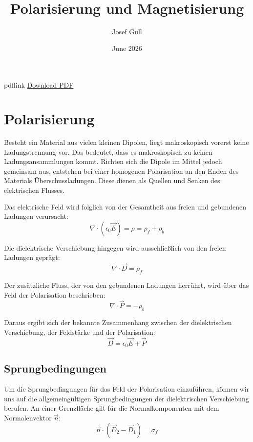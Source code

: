 \documentclass[11pt]{article}
\title{Polarisierung und Magnetisierung}
\author{Josef Gull}
\date{June 2026}
\begin{document}
\maketitle
\begin{warpHTML}
\begin{BlockClass}{pdflink}
\href{polarisierung-magnetisierung.pdf}{Download PDF}
\end{BlockClass}
\end{warpHTML}
\tableofcontents

\section{Polarisierung}
Besteht ein Material aus vielen kleinen Dipolen, liegt makroskopisch vorerst keine Ladungstrennung vor. Das bedeutet, dass es makroskopisch zu keinen Ladungsansammlungen kommt. Richten sich die Dipole im Mittel jedoch gemeinsam aus, entstehen bei einer homogenen Polarisation an den Enden des Materials Überschussladungen. Diese dienen als Quellen und Senken des elektrischen Flusses.

Das elektrische Feld wird folglich von der Gesamtheit aus freien und gebundenen Ladungen verursacht:
\begin{equation}
    \nabla \cdot (\epsilon_0 \vec{E}) = \rho = \rho_f + \rho_b
\end{equation}

Die dielektrische Verschiebung hingegen wird ausschließlich von den freien Ladungen geprägt:
\begin{equation}
    \nabla \cdot \vec{D} = \rho_f
\end{equation}

Der zusätzliche Fluss, der von den gebundenen Ladungen herrührt, wird über das Feld der Polarisation beschrieben:
\begin{equation}
    \nabla \cdot \vec{P} = -\rho_b
\end{equation}

Daraus ergibt sich der bekannte Zusammenhang zwischen der dielektrischen Verschiebung, der Feldstärke und der Polarisation:
\begin{equation}
    \vec{D} = \epsilon_0 \vec{E} + \vec{P}
\end{equation}

\subsection{Sprungbedingungen}
Um die Sprungbedingungen für das Feld der Polarisation einzuführen, können wir uns auf die allgemeingültigen Sprungbedingungen der dielektrischen Verschiebung berufen. An einer Grenzfläche gilt für die Normalkomponenten mit dem Normalenvektor $\vec{n}$:
\begin{equation}
    \vec{n} \cdot (\vec{D}_2 - \vec{D}_1) = \sigma_f
\end{equation}
\end{document}
